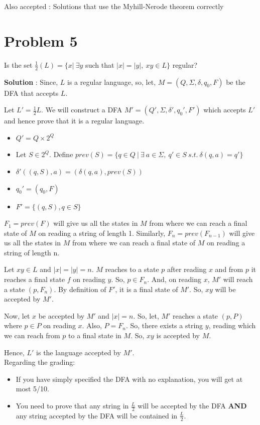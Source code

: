 \documentclass{article}
\begin{document}
    \quad Also accepted : Solutions that use the Myhill-Nerode theorem correctly
    

    \section*{Problem 5} Is the set $\frac{1}{2}(L) = \{ x|~ \exists y$ such that $|x| = |y|, ~xy \in L \}$ regular?
    
    \textbf{Solution} : Since, $L$ is a regular language, so, let, $M = (Q,\Sigma, \delta, q_0, F)$ be the DFA that accepts $L$.
    
    Let $L' = \frac{1}{2}L $. We will construct a DFA $M' = (Q',\Sigma, \delta', q_0', F')$ which accepts $L'$ and hence prove that it is a regular language.
    \begin{itemize}
        \item $Q' = Q \times 2^Q $
        \item Let $S\in2^Q$. Define 
         $prev(S)= \{q \in Q\ | \ \exists\ a \in \Sigma,\ q' \in S\ s.t.\ \delta(q,a) = q'\}$
        \item $\delta'((q,S), a) = (\delta(q,a),prev(S))$
        \item $q_0' = (q_0,F)$
        \item $F' = \{(q,S), q\in S\}$
    \end{itemize}
    
    $F_1 = prev(F)$ will give us all the states in $M$ from where we can reach a final state of $M$ on reading a string of length 1. Similarly, $F_n = prev(F_{n-1})$ will give us all the states in $M$ from where we can reach a final state of $M$ on reading a string of length n.
    
    Let $xy \in L$ and $|x| = |y| = n$. $M$ reaches to a state $p$ after reading $x$ and from $p$ it reaches a final state $f$ on reading $y$. So, $p \in F_n$. And, on reading $x$, $M'$ will reach a state $(p, F_n)$. By definition of $F'$, it is a final state of $M'$. So, $xy$ will be accepted by $M'$.
    
    Now, let $x$ be accepted by $M'$ and $|x| = n$. So, let, $M'$ reaches a state $(p, P)$ where $p \in P$ on reading $x$. Also, $P = F_n$. So, there exists a string $y$, reading which we can reach from $p$ to a final state in $M$. So, $xy$ is accepted by $M$.

    Hence, $L'$ is the language accepted by $M'$.\\
    

    Regarding the grading:
    \begin{itemize}
        \item If you have simply specified the DFA with no explanation, you will get at most 5/10.
        \item You need to prove that any string in $\frac{L}{2}$ will be accepted by the DFA \textbf{AND} any string accepted by the DFA will be contained in $\frac{L}{2}$. 
    \end{itemize}
    
\end{document}
